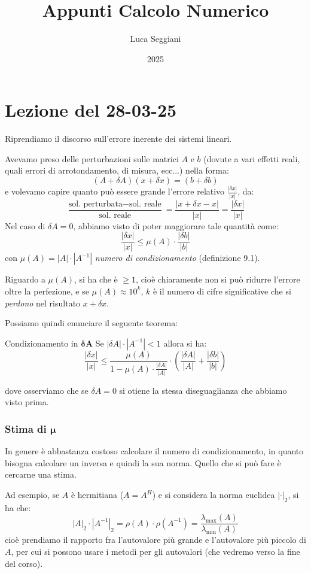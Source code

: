 \documentclass[a4paper,11pt]{article}
\title{Appunti Calcolo Numerico}
\author{Luca Seggiani}
\date{2025}
\begin{document}
\section{Lezione del 28-03-25}

\thispagestyle{empty}
\pagestyle{fancy}

Riprendiamo il discorso sull'errore inerente dei sistemi lineari.

Avevamo preso delle perturbazioni sulle matrici $A$ e $b$ (dovute a vari effetti reali, quali errori di arrotondamento, di misura, ecc...) nella forma:
$$
(A + \delta A) (x + \delta x) = (b + \delta b)
$$
e volevamo capire quanto può essere grande l'errore relativo $\frac{|\delta x|}{|x|}$, da:
$$
\frac{ \text{sol. perturbata} - \text{sol. reale} }{ \text{sol. reale} } = \frac{|x + \delta x - x|}{|x|} = \frac{|\delta x|}{|x|}
$$
Nel caso di $\delta A = 0$, abbiamo visto di poter maggiorare tale quantità come:
$$
\frac{|\delta x|}{|x|} \leq \mu(A) \cdot \frac{|\delta b|}{|b|}
$$
con $\mu(A) = |A| \cdot |A^{-1}|$ \textit{numero di condizionamento} (definizione 9.1).

Riguardo a $\mu(A)$, si ha che è $\geq 1$, cioè chiaramente non si può ridurre l'errore oltre la perfezione, e se $\mu(A) \approx 10^{k}$, $k$ è il numero di cifre significative che si \textit{perdono} nel risultato $x + \delta x$.

Possiamo quindi enunciare il seguente teorema:
\begin{theorem}{Condizionamento in $\mathbf{ \delta A }$}
	Se $|\delta A| \cdot |A^{-1}| < 1$ allora si ha:
	$$
	\frac{| \delta x|}{|x|} \leq \frac{\mu(A)}{1 - \mu(A) \cdot \frac{ |\delta A| }{|A|}} \cdot \left( \frac{|\delta A|}{|A|} + \frac{|\delta b|}{|b|} \right)
	$$
\end{theorem}
dove osserviamo che se $\delta A = 0$ si otiene la stessa diseguaglianza che abbiamo visto prima.

\subsubsection{Stima di $\mathbf{\mu}$}
In genere è abbastanza costoso calcolare il numero di condizionamento, in quanto bisogna calcolare un inversa e quindi la sua norma.
Quello che si può fare è cercarne una stima.

Ad esempio, se $A$ è hermitiana ($A = A^H$) e si considera la norma euclidea $|\cdot|_2$, si ha che:
$$
|A|_2 \cdot |A^{-1}|_2 = \rho(A) \cdot \rho(A^{-1}) = \frac{\lambda_\text{max}(A)}{\lambda_\text{min}(A)}
$$
cioè prendiamo il rapporto fra l'autovalore più grande e l'autovalore più piccolo di $A$, per cui si possono usare i metodi per gli autovalori (che vedremo verso la fine del corso).
\end{document}
